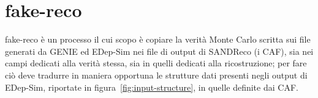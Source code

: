 \documentclass[../main.tex]{subfiles}
\begin{document}
\chapter{fake-reco} \label{ch:fake-reco}
  fake-reco è un processo il cui scopo è copiare la verità Monte Carlo
  scritta sui file generati da GENIE ed EDep-Sim nei file di output di
  SANDReco (i CAF), sia nei campi dedicati alla verità stessa, sia in quelli
  dedicati alla ricostruzione; per fare ciò deve tradurre in maniera
  opportuna le strutture dati presenti negli output di EDep-Sim, riportate
  in figura~\ref{fig:input-structure}, in quelle definite dai CAF\@.\\

  

  

  

  

  \clearpage

  
\end{document}
